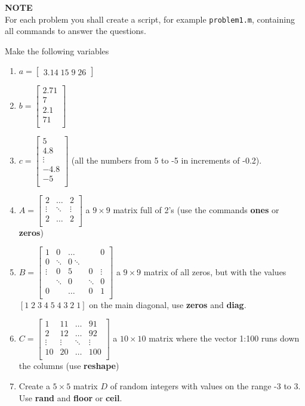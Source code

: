 \documentclass[12pt]{TDTP}
\begin{document}
\titre

\textbf{NOTE}\\
For each problem you shall create a script, for example \texttt{problem1.m}, containing all commands to answer the questions.

\Exo
Make the following variables
\begin{enumerate}
\item $a = \begin{bmatrix} 3.14 \; 15 \; 9 \; 26 \end{bmatrix}$
\item $b = \begin{bmatrix} 2.71 \\ 7 \\ 2.1 \\ 71\\ \end{bmatrix}$
 \item $c = \begin{bmatrix} 5 \\ 4.8 \\ \vdots \\ -4.8\\ -5 \\ \end{bmatrix}$ (all the numbers from 5 to -5 in increments of -0.2).
 \item $A = \begin{bmatrix} 
 2 & \ldots & 2 \\ 
 \vdots & \ddots & \vdots\\ 
 2 & \ldots & 2 \\
 \end{bmatrix}$ a $9\times 9$ matrix full of 2's (use the commands \textbf{ones} or \textbf{zeros})
\item $B = \begin{bmatrix} 
 1 & 0 & \ldots & & 0 \\ 
 0 & \ddots & 0 \ddots & \\ 
 \vdots & 0 & 5 & 0 & \vdots \\
  & \ddots & 0 & \ddots & 0 \\
  0 &  & \ldots & 0 & 1\\
 \end{bmatrix}$ 
 a $9\times 9$ matrix of all zeros, but with the values $[1 \; 2 \; 3 \;  4 \; 5 \;  4 \;  3 \;  2 \;  1]$ on the main diagonal, use \textbf{zeros} and \textbf{diag}.
\item $C = \begin{bmatrix} 
 1 & 11 & \ldots & 91 \\ 
2 & 12 & \ldots & 92 \\ 
\vdots & \vdots & \ddots & \vdots \\ 
10 & 20 & \ldots & 100 \\ 
 \end{bmatrix}$
 a $10\times 10 $ matrix where the vector 1:100 runs down the columns (use \textbf{reshape})
 \item Create a $5\times 5$ matrix $D$ of random integers with values on the range -3 to 3. Use \textbf{rand} and \textbf{floor} or \textbf{ceil}.
\end{enumerate}
\end{document}
